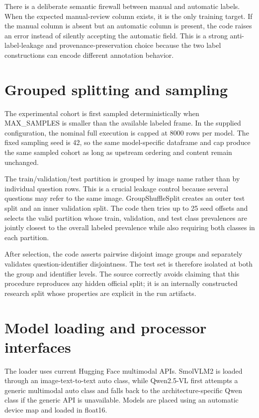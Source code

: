 \documentclass[11pt,a4paper]{article}
\begin{document}
There is a deliberate semantic firewall between manual and automatic labels. When the expected manual-review column exists, it is the only training target. If the manual column is absent but an automatic column is present, the code raises an error instead of silently accepting the automatic field. This is a strong anti-label-leakage and provenance-preservation choice because the two label constructions can encode different annotation behavior.

\section{Grouped splitting and sampling}

The experimental cohort is first sampled deterministically when MAX\_SAMPLES is smaller than the available labeled frame. In the supplied configuration, the nominal full execution is capped at 8000 rows per model. The fixed sampling seed is 42, so the same model-specific dataframe and cap produce the same sampled cohort as long as upstream ordering and content remain unchanged.

The train/validation/test partition is grouped by image name rather than by individual question rows. This is a crucial leakage control because several questions may refer to the same image. GroupShuffleSplit creates an outer test split and an inner validation split. The code then tries up to 25 seed offsets and selects the valid partition whose train, validation, and test class prevalences are jointly closest to the overall labeled prevalence while also requiring both classes in each partition.

After selection, the code asserts pairwise disjoint image groups and separately validates question-identifier disjointness. The test set is therefore isolated at both the group and identifier levels. The source correctly avoids claiming that this procedure reproduces any hidden official split; it is an internally constructed research split whose properties are explicit in the run artifacts.

\section{Model loading and processor interfaces}

The loader uses current Hugging Face multimodal APIs. SmolVLM2 is loaded through an image-text-to-text auto class, while Qwen2.5-VL first attempts a generic multimodal auto class and falls back to the architecture-specific Qwen class if the generic API is unavailable. Models are placed using an automatic device map and loaded in float16.
\end{document}
